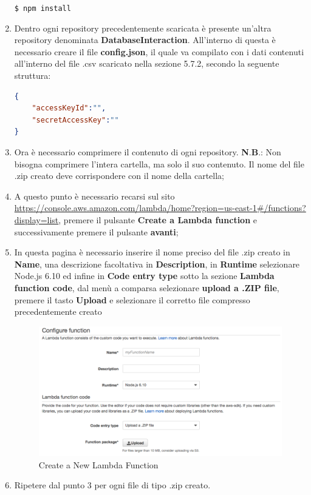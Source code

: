 \documentclass[../ManualeSviluppatore_v1.0.0.tex]{subfiles}
\begin{document}
\begin{enumerate}
\begin{center}
				\texttt{\$ npm install}
			\end{center}
			\item Dentro ogni repository precedentemente scaricata è presente un'altra repository denominata \textbf{DatabaseInteraction}. All'interno di questa è necessario creare il file \textbf{config.json}, il quale va compilato con i dati contenuti all'interno del file .csv scaricato nella sezione 5.7.2, secondo la seguente struttura:
			\begin{lstlisting}[language=json,firstnumber=1]
{
	"accessKeyId":"",
	"secretAccessKey":""
}
			\end{lstlisting}
			\item Ora è necessario comprimere il contenuto di ogni repository.
			\newline
			\textbf{N}.\textbf{B}.: Non bisogna comprimere l'intera cartella, ma solo il suo contenuto. Il nome del file .zip creato deve corrispondere con il nome della cartella;
			\item A questo punto è necessario recarsi sul sito \url{https://console.aws.amazon.com/lambda/home?region=us-east-1#/functions?display=list}, premere il pulsante \textbf{Create a Lambda function} e successivamente premere il pulsante \textbf{avanti};
			\newpage
			\item In questa pagina è necessario inserire il nome preciso del file .zip creato in \textbf{Name}, una descrizione facoltativa in \textbf{Description}, in \textbf{Runtime} selezionare Node.js 6.10 ed infine in \textbf{Code entry type} sotto la sezione \textbf{Lambda function code}, dal menù a comparsa selezionare \textbf{upload a .ZIP file}, premere il tasto \textbf{Upload} e selezionare il corretto file compresso precedentemente creato
			\begin{figure}[!h]
				\centering
				\includegraphics[width=\textwidth]{Screenshot/LambdaCreate.png}
				\caption{Create a New Lambda Function}
			\end{figure}
			\item Ripetere dal punto 3 per ogni file di tipo .zip creato. 
		\end{enumerate}
	\newpage
\end{document}
